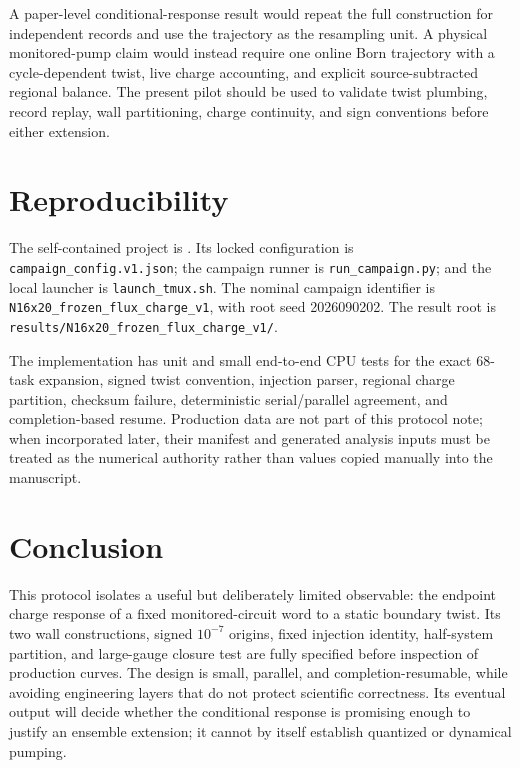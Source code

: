 \documentclass[aps,prb,twocolumn,floatfix,nofootinbib,superscriptaddress]{revtex4-2}
\newcommand{\code}[1]{\texttt{#1}}
\begin{document}
A paper-level conditional-response result would repeat the full construction
for independent records and use the trajectory as the resampling unit.  A
physical monitored-pump claim would instead require one online Born trajectory
with a cycle-dependent twist, live charge accounting, and explicit
source-subtracted regional balance.  The present pilot should be used to
validate twist plumbing, record replay, wall partitioning, charge continuity,
and sign conventions before either extension.

\section{Reproducibility}

The self-contained project is
.
Its locked configuration is \code{campaign\_config.v1.json}; the campaign
runner is \code{run\_campaign.py}; and the local launcher is
\code{launch\_tmux.sh}.  The nominal campaign identifier is
\code{N16x20\_frozen\_flux\_charge\_v1}, with root seed 2026090202.
The result root is
\code{results/N16x20\_frozen\_flux\_charge\_v1/}.

The implementation has unit and small end-to-end CPU tests for the exact
68-task expansion, signed twist convention, injection parser, regional charge
partition, checksum failure, deterministic serial/parallel agreement, and
completion-based resume.  Production data are not part of this protocol note;
when incorporated later, their manifest and generated analysis inputs must be
treated as the numerical authority rather than values copied manually into
the manuscript.

\section{Conclusion}

This protocol isolates a useful but deliberately limited observable: the
endpoint charge response of a fixed monitored-circuit word to a static
boundary twist.  Its two wall constructions, signed $10^{-7}$ origins, fixed
injection identity, half-system partition, and large-gauge closure test are
fully specified before inspection of production curves.  The design is small,
parallel, and completion-resumable, while avoiding engineering layers that do
not protect scientific correctness.  Its eventual output will decide whether
the conditional response is promising enough to justify an ensemble
extension; it cannot by itself establish quantized or dynamical pumping.



\end{document}
